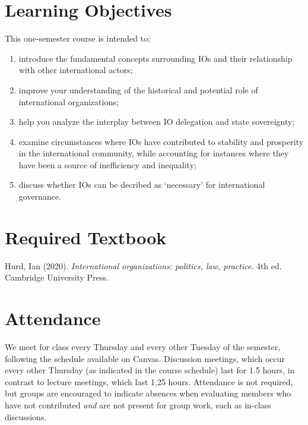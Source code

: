 \documentclass[10pt,]{article}
\providecommand{\tightlist}{%
  \setlength{\itemsep}{0pt}\setlength{\parskip}{0pt}}
\begin{document}
\hypertarget{learning-objectives}{%
\section{Learning Objectives}\label{learning-objectives}}

This one-semester course is intended to:

\begin{enumerate}
\def\labelenumi{\arabic{enumi}.}
\tightlist
\item
  introduce the fundamental concepts surrounding IOs and their
  relationship with other international actors;
\item
  improve your understanding of the historical and potential role of
  international organizations;
\item
  help you analyze the interplay between IO delegation and state
  sovereignty;
\item
  examine circumstances where IOs have contributed to stability and
  prosperity in the international community, while accounting for
  instances where they have been a source of inefficiency and
  inequality;
\item
  discuss whether IOs can be decribed as `necessary' for international
  governance.
\end{enumerate}

\hypertarget{required-textbook}{%
\section{Required Textbook}\label{required-textbook}}

Hurd, Ian (2020).
\emph{International organizations: politics, law, practice}. 4th ed.
Cambridge University Press.

\hypertarget{attendance}{%
\section{Attendance}\label{attendance}}

We meet for class every Thursday and every other Tuesday of the
semester, following the schedule available on Canvas. Discussion
meetings, which occur every other Thursday (as indicated in the course
schedule) last for 1.5 hours, in contrast to lecture meetings, which
last 1.25 hours. Attendance is not required, but groups are encouraged
to indicate absences when evaluating members who have not contributed
\emph{and} are not present for group work, such as in-class discussions.
\end{document}
